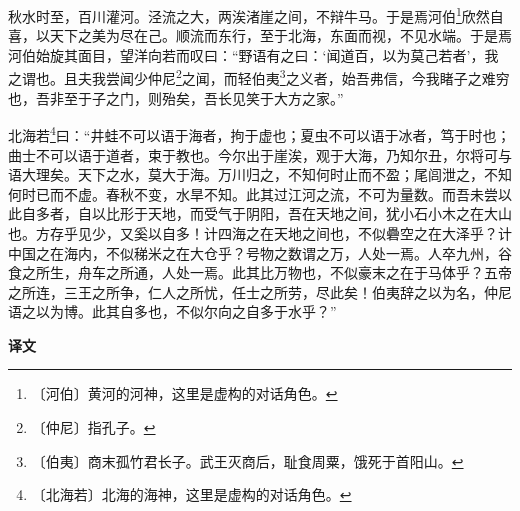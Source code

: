 \documentclass[12pt,UTF-8,openany,a4]{ctexbook}
\begin{document}
\begin{large}
    
    秋水时至，百川灌河。泾流之大，两涘渚崖之间，不辩牛马。于是焉河伯\footnote{〔河伯〕\yiwen 黄河的河神，这里是虚构的对话角色。}欣然自喜，以天下之美为尽在己。顺流而东行，至于北海，东面而视，不见水端。于是焉河伯始旋其面目，望洋向若而叹曰：“野语有之曰：‘闻道百，以为莫己若者’，我之谓也。且夫我尝闻少仲尼\footnote{〔仲尼〕\yiwen 指孔子。}之闻，而轻伯夷\footnote{〔伯夷〕\yiwen 商末孤竹君长子。武王灭商后，耻食周粟，饿死于首阳山。}之义者，始吾弗信，今我睹子之难穷也，吾非至于子之门，则殆矣，吾长见笑于大方之家。”
    
    北海若\footnote{〔北海若〕\yiwen 北海的海神，这里是虚构的对话角色。}曰：“井蛙不可以语于海者，拘于虚也；夏虫不可以语于冰者，笃于时也；曲士不可以语于道者，束于教也。今尔出于崖涘，观于大海，乃知尔丑，尔将可与语大理矣。天下之水，莫大于海。万川归之，不知何时止而不盈；尾闾泄之，不知何时已而不虚。春秋不变，水旱不知。此其过江河之流，不可为量数。而吾未尝以此自多者，自以比形于天地，而受气于阴阳，吾在天地之间，犹小石小木之在大山也。方存乎见少，又奚以自多！计四海之在天地之间也，不似礨空之在大泽乎？计中国之在海内，不似稊米之在大仓乎？号物之数谓之万，人处一焉。人卒九州，谷食之所生，舟车之所通，人处一焉。此其比万物也，不似豪末之在于马体乎？五帝之所连，三王之所争，仁人之所忧，任士之所劳，尽此矣！伯夷辞之以为名，仲尼语之以为博。此其自多也，不似尔向之自多于水乎？”
\end{large}


\newpage

\begin{Large}
    \noindent\textbf{译文}
\end{Large}


\vspace{1em}
\end{document}
